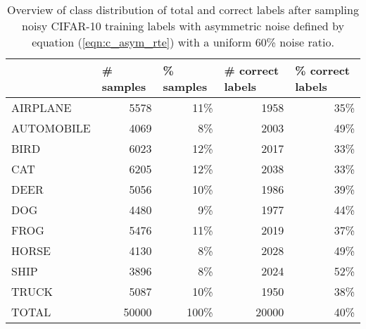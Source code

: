 \documentclass{article}
\begin{document}
\label{sec:c_asym_sample_60}
\begin{table*}[h]
\renewcommand{\arraystretch}{1.3}
\centering
  \caption{Overview of class distribution of total and correct labels after sampling noisy CIFAR-10 training labels with asymmetric noise defined by equation (\ref{eqn:c_asym_rte}) with a uniform 60\% noise ratio.\newline}
  
\begin{tabular}{lrrrr}
\toprule
          & \multicolumn{1}{l}{\# samples} & \multicolumn{1}{l}{\% samples} & \multicolumn{1}{l}{\# correct labels} & \multicolumn{1}{l}{\% correct labels} \\ \hline
\small{AIRPLANE}   & 5578                           & 11\%                           & 1958                                  & 35\%                                  \\
\small{AUTOMOBILE} & 4069                           & 8\%                            & 2003                                  & 49\%                                  \\
\small{BIRD}       & 6023                           & 12\%                           & 2017                                  & 33\%                                  \\
\small{CAT}        & 6205                           & 12\%                           & 2038                                  & 33\%                                  \\
\small{DEER}       & 5056                           & 10\%                           & 1986                                  & 39\%                                  \\
\small{DOG}        & 4480                           & 9\%                            & 1977                                  & 44\%                                  \\
\small{FROG}       & 5476                           & 11\%                           & 2019                                  & 37\%                                  \\
\small{HORSE}      & 4130                           & 8\%                            & 2028                                  & 49\%                                  \\
\small{SHIP}       & 3896                           & 8\%                            & 2024                                  & 52\%                                  \\
\small{TRUCK}      & 5087                           & 10\%                           & 1950                                  & 38\%                                  \\ \hline
TOTAL      & 50000                          & 100\%                          & 20000                                 & 40\%                                  \\ 
\bottomrule
\end{tabular}
\label{tab:c_asym_sample_60}
\end{table*}
\end{document}
